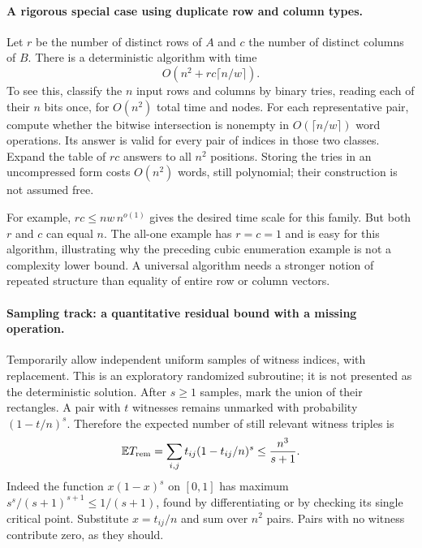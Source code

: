 \documentclass[11pt]{article}
\begin{document}
\paragraph{A rigorous special case using duplicate row and column types.}
Let $r$ be the number of distinct rows of $A$ and $c$ the number of
distinct columns of $B$. There is a deterministic algorithm with time
\begin{equation}\label{a480:types}
                 O(n^2+rc\lceil n/w\rceil).
\end{equation}
To see this, classify the $n$ input rows and columns by binary tries,
reading each of their $n$ bits once, for $O(n^2)$ total time and nodes.
For each representative pair, compute whether the bitwise intersection
is nonempty in $O(\lceil n/w\rceil)$ word operations. Its answer is
valid for every pair of indices in those two classes. Expand the table
of $rc$ answers to all $n^2$ positions. Storing the tries in an uncompressed
form costs $O(n^2)$ words, still polynomial; their construction is not
assumed free.

For example, $rc\leq nw\,n^{o(1)}$ gives the desired time scale for
this family. But both $r$ and $c$ can equal $n$. The all-one example has
$r=c=1$ and is easy for this algorithm, illustrating why the preceding
cubic enumeration example is not a complexity lower bound. A universal
algorithm needs a stronger notion of repeated structure than equality
of entire row or column vectors.

\paragraph{Sampling track: a quantitative residual bound with a missing operation.}
Temporarily allow independent uniform samples of witness indices, with
replacement. This is an exploratory randomized subroutine; it is not
presented as the deterministic solution. After $s\geq1$ samples, mark
the union of their rectangles. A pair with $t$ witnesses remains
unmarked with probability $(1-t/n)^s$. Therefore the expected number
of still relevant witness triples is
\begin{equation}\label{a480:residualmass}
 \mathbb E T_{\rm rem}
 =\sum_{i,j} t_{ij}(1-t_{ij}/n)^s
 \leq\frac{n^3}{s+1}.
\end{equation}
Indeed the function $x(1-x)^s$ on $[0,1]$ has maximum
$s^s/(s+1)^{s+1}\leq1/(s+1)$, found by differentiating or by
checking its single critical point. Substitute $x=t_{ij}/n$ and sum
over $n^2$ pairs. Pairs with no witness contribute zero, as they should.
\end{document}
